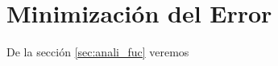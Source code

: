 \chapter{Minimización del Error} \label{cap:min_error}
	\lipsum \lipsum[3]
	
	De la sección \ref{sec:anali_fuc} veremos \lipsum[1]